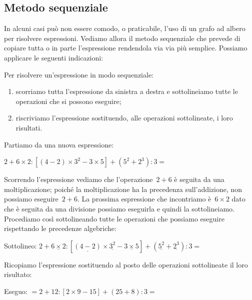 \subsection{Metodo sequenziale}

In alcuni casi può non essere comodo, o praticabile, l'uso di un grafo ad 
albero per risolvere espressioni. 
Vediamo allora il metodo sequenziale che prevede di copiare tutta o in 
parte l'espressione rendendola via via più semplice. 
Possiamo applicare le seguenti indicazioni:

\begin{procedura}{}{}
 Per risolvere un'espressione in modo sequenziale:
\begin{enumerate} [noitemsep] 
\item scorriamo tutta l'espressione da sinistra a destra 
e sottolineiamo tutte le operazioni che si possono eseguire;
\item riscriviamo l'espressione sostituendo, alle operazioni sottolineate,
i loro risultati.
\end{enumerate}
\end{procedura}

Partiamo da una nuova espressione:

\(2 + 6 \times 2 : 
 \left[ \left(4 -2 \right) \times 3^{2} - 3 \times 5 \right] +
 \left( 5^{2} + 2^{3} \right) : 3 =\)

Scorrendo l'espressione vediamo che l'operazione~\(2 + 6\) è seguita da una 
moltiplicazione; poiché la moltiplicazione ha la precedenza sull'addizione,
non possiamo eseguire~\(2 + 6\). La prossima espressione che incontriamo 
è~\(6 \times 2\) dato che è seguita da una divisione possiamo eseguirla e 
quindi la sottolineiamo. Procediamo così sottolineando tutte le operazioni
che possiamo eseguire rispettando le precedenze algebriche:

\noindent Sottolineo: \hspace{28mm} \(2 + 
 \underline{6 \times 2} : \left[ \underline{\left(4 -2 \right)} 
   \times \underline{3^{2}} - 
   \underline{3 \times 5} \right] +
 \left( \underline{5^{2}} + \underline{2^{3}} \right) : 3 =\)

Ricopiamo l'espressione sostituendo al posto delle operazioni 
sottolineate il loro risultato:

\noindent Eseguo: \hspace{28.7mm} \(= 2 + 
 12 : \left[ 2 \times 9 - 15 \right] +
 \left( 25 + 8 \right) : 3 =\)

